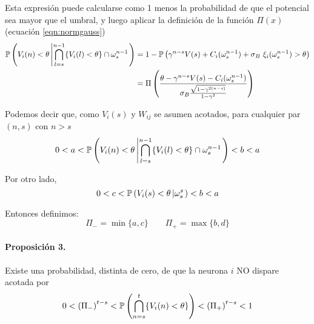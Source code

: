 Esta expresión puede calcularse como 1 menos la probabilidad de que el potencial sea mayor que el umbral, y luego aplicar la definición de la función $\Pi(x)$ (ecuación \eqref{eqn:normgauss})
\begin{align*}
     \mathbb{P}\left( V_i(n) < \theta \left|  \bigcap_{l=s}^{n-1} \{ V_i(l) < \theta \} \cap \omega_s^{n-1} \right.\right) & =  1-  \mathbb{P}\left( \gamma^{n-s} V(s) + C_i(\omega_s^{n-1}) + \sigma_B \  \xi_i(\omega_s^{n-1}) > \theta \right) \\
     & =  \Pi\left(\frac{\theta - \gamma^{n-s} V(s) - C_i(\omega_s^{n-1})}{\sigma_B \frac{\sqrt{1-\gamma^{2(n-s)}}}{1-\gamma^2}} \right)
\end{align*}

Podemos decir que, como $V_i(s)$ y $W_{ij}$ se asumen acotados, para cualquier par $(n,s)$ con $n>s$
\begin{equation*}
     0 < a <\mathbb{P}\left( V_i(n) < \theta \left|  \bigcap_{l=s}^{n-1} \{ V_i(l) < \theta \} \cap \omega_s^{n-1} \right. \right) <b<a
\end{equation*}

Por otro lado, 
\begin{equation*}
     0 < c <\mathbb{P}\left( V_i(s) < \theta \left|  \omega_s^s \right.\right) <b<a
\end{equation*}

Entonces definimos:
\begin{equation}
    \Pi_- = \min\{a,c\} \qquad \Pi_+ = \max\{b,d\}
\end{equation}

\paragraph{Proposición 3.}
Existe una probabilidad, distinta de cero, de que la neurona $i$ NO dispare acotada por
\begin{equation}
    0 < \left( \Pi_- \right)^{t-s} < \mathbb{P}\left( \bigcap_{n=s}^t \{V_i(n) < \theta \} \right)  < \left( \Pi_+ \right)^{t-s} < 1
\end{equation}

